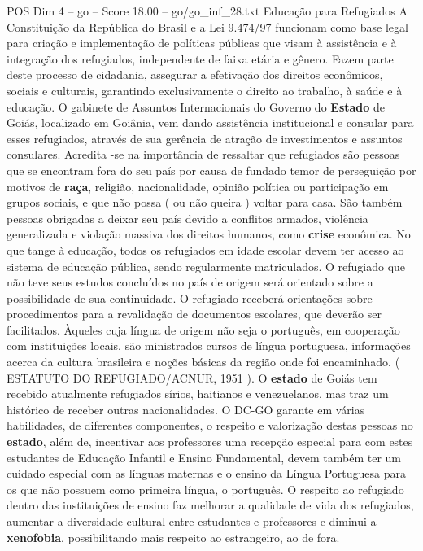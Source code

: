 \begin{textsample}{POS Dim 4 – go – Score 18.00 – go/go\_inf\_28.txt}
Educação para Refugiados A Constituição da República do Brasil e a Lei 9.474/97 funcionam como base legal para criação e implementação de políticas públicas que visam à assistência e à integração dos refugiados, independente de faixa etária e gênero.
Fazem parte deste processo de cidadania, assegurar a efetivação dos direitos econômicos, sociais e culturais, garantindo exclusivamente o direito ao trabalho, à saúde e à educação.
O gabinete de Assuntos Internacionais do Governo do \textbf{Estado} de Goiás, localizado em Goiânia, vem dando assistência institucional e consular para esses refugiados, através de sua gerência de atração de investimentos e assuntos consulares.
Acredita -se na importância de ressaltar que refugiados são pessoas que se encontram fora do seu país por causa de fundado temor de perseguição por motivos de \textbf{raça}, religião, nacionalidade, opinião política ou participação em grupos sociais, e que não possa ( ou não queira ) voltar para casa.
São também pessoas obrigadas a deixar seu país devido a conflitos armados, violência generalizada e violação massiva dos direitos humanos, como \textbf{crise} econômica.
No que tange à educação, todos os refugiados em idade escolar devem ter acesso ao sistema de educação pública, sendo regularmente matriculados.
O refugiado que não teve seus estudos concluídos no país de origem será orientado sobre a possibilidade de sua continuidade.
O refugiado receberá orientações sobre procedimentos para a revalidação de documentos escolares, que deverão ser facilitados.
Àqueles cuja língua de origem não seja o português, em cooperação com instituições locais, são ministrados cursos de língua portuguesa, informações acerca da cultura brasileira e noções básicas da região onde foi encaminhado. ( ESTATUTO DO REFUGIADO/ACNUR, 1951 ).
O \textbf{estado} de Goiás tem recebido atualmente refugiados sírios, haitianos e venezuelanos, mas traz um histórico de receber outras nacionalidades.
O DC-GO garante em várias habilidades, de diferentes componentes, o respeito e valorização destas pessoas no \textbf{estado}, além de, incentivar aos professores uma recepção especial para com estes estudantes de Educação Infantil e Ensino Fundamental, devem também ter um cuidado especial com as línguas maternas e o ensino da Língua Portuguesa para os que não possuem como primeira língua, o português.
O respeito ao refugiado dentro das instituições de ensino faz melhorar a qualidade de vida dos refugiados, aumentar a diversidade cultural entre estudantes e professores e diminui a \textbf{xenofobia}, possibilitando mais respeito ao estrangeiro, ao de fora.

\end{textsample}

